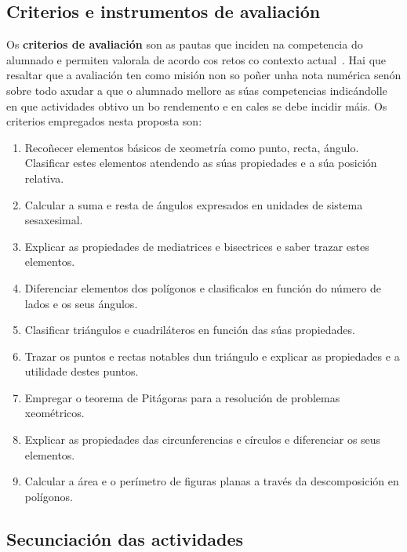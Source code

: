 \subsection{Criterios e instrumentos de avaliación}

Os \textbf{criterios de avaliación} son as pautas que inciden na competencia do alumnado e permiten valorala de acordo cos retos co contexto actual~\cite[p. 134]{secdidac}. Hai que resaltar que a avaliación ten como misión non so poñer unha nota numérica senón sobre todo axudar a que o alumnado mellore as súas competencias indicándolle en que actividades obtivo un bo rendemento e en cales se debe incidir máis. Os criterios empregados nesta proposta son:

\begin{enumerate}[label=\bfseries Cri\arabic*]
  \item\label{cri1} Recoñecer elementos básicos de xeometría como punto, recta, ángulo. Clasificar estes elementos atendendo as súas propiedades e a súa posición relativa.
  \item\label{cri2} Calcular a suma e resta de ángulos expresados en unidades de sistema sesaxesimal.
  \item\label{cri3} Explicar as propiedades de mediatrices e bisectrices e saber trazar estes elementos.
  \item\label{cri4} Diferenciar elementos dos polígonos e clasificalos en función do número de lados e os seus ángulos.
  \item\label{cri5} Clasificar triángulos e cuadriláteros en función das súas propiedades.
  \item\label{cri6} Trazar os puntos e rectas notables dun triángulo e explicar as propiedades e a utilidade destes puntos.
  \item\label{cri7} Empregar o teorema de Pitágoras para a resolución de problemas xeométricos.
  \item\label{cri8} Explicar as propiedades das circunferencias e círculos e diferenciar os seus elementos.
  \item\label{cri9} Calcular a área e o perímetro de figuras planas a través da descomposición en polígonos.
\end{enumerate}


\subsection{Secunciación das actividades}


